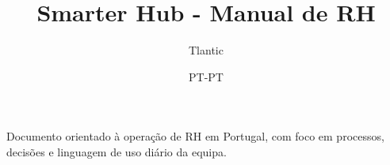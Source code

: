 \documentclass[11pt,a4paper]{report}
\title{Smarter Hub - Manual de RH}
\author{Tlantic}
\date{PT-PT}
\begin{document}
\maketitle
\begin{manualnote}
Documento orientado à operação de RH em Portugal, com foco em processos, decisões e linguagem de uso diário da equipa.
\end{manualnote}
\tableofcontents

\end{document}
